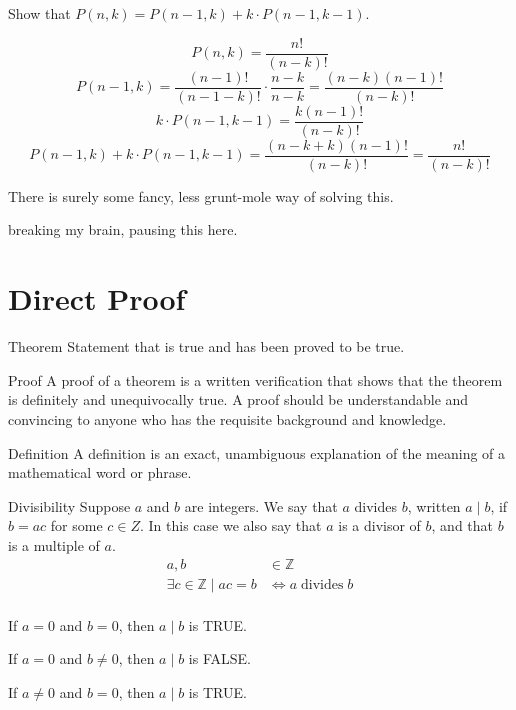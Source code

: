 \documentclass[openany, 12pt]{book}
\begin{document}
\begin{exercise}{}{}
	Show that $P(n,k) = P(n-1,k)+ k \cdot P(n-1,k -1)$.
	\begin{alist}
		\item
		$$ P(n,k) = \dfrac{n!}{(n-k)!}$$
		$$ P(n-1,k) =  \dfrac{(n-1)!}{(n-1-k)!}\cdot\dfrac{n-k}{n-k} =\dfrac{(n-k)(n-1)!}{(n-k)!}
		$$
		$$ k\cdot P(n-1,k -1) = \dfrac{k(n-1)!}{(n-k)!}$$
		$$ P(n-1,k)+ k \cdot P(n-1,k -1) = \dfrac{(n-k+k)(n-1)!}{(n-k)!} =
			\dfrac{n!}{(n-k)!}
		$$
		\item There is surely some fancy, less grunt-mole way of solving this.
	\end{alist}
\end{exercise}

breaking my brain, pausing this here.

\chapter{Direct Proof}
\begin{definition}{Theorem}{}
	Statement that is true and has been proved to be true.
\end{definition}

\begin{definition}{Proof}{}
	A proof of a theorem is a written verification that shows that the theorem
	is definitely and unequivocally true. A proof should be understandable and
	convincing to anyone who has the requisite background and knowledge.
\end{definition}

\begin{definition}{Definition}{}
	A definition is an exact, unambiguous explanation of the meaning of a
	mathematical word or phrase.
\end{definition}

\begin{definition}{Divisibility}{}
	Suppose $a$ and $b$ are integers. We say that $a$ divides $b$, written $a
		\mid b$, if $b=a c$ for some $c \in Z$. In this case we also say that $a$ is
	a divisor of $b$, and that $b$ is a multiple of $a$.
	\begin{align*}
		a, b                            & \in\mathbb{Z}             \\
		\exists c\in\mathbb{Z}\mid ac=b & \iff a\;\text{divides}\;b \\
	\end{align*}

	\begin{alist}
		\item If $a = 0$ and $b = 0$, then $a \mid b$ is TRUE.
		\item If $a = 0$ and $b \neq 0$, then $a \mid b$ is FALSE.
		\item If $a \neq 0$ and $b = 0$, then $a \mid b$ is TRUE.
	\end{alist}
\end{definition}
\end{document}
